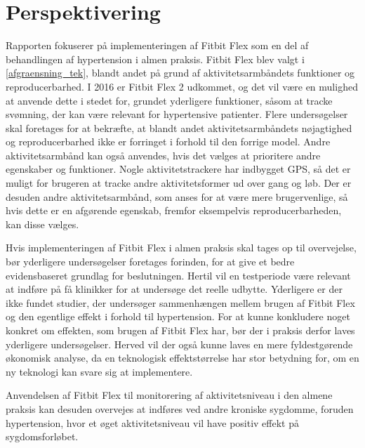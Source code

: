\chapter{Perspektivering}
Rapporten fokuserer på implementeringen af Fitbit Flex som en del af behandlingen af hypertension i almen praksis. Fitbit Flex blev valgt i \autoref{afgraensning_tek}, blandt andet på grund af aktivitetsarmbåndets funktioner og reproducerbarhed. I 2016 er Fitbit Flex 2 udkommet, og det vil være en mulighed at anvende dette i stedet for, grundet yderligere funktioner, såsom at tracke svømning, der kan være relevant for hypertensive patienter. Flere undersøgelser skal foretages for at bekræfte, at blandt andet aktivitetsarmbåndets nøjagtighed og reproducerbarhed ikke er forringet i forhold til den forrige model. Andre aktivitetsarmbånd kan også anvendes, hvis det vælges at prioritere andre egenskaber og funktioner. Nogle aktivitetstrackere har indbygget GPS, så det er muligt for brugeren at tracke andre aktivitetsformer ud over gang og løb. Der er desuden andre aktivitetsarmbånd,  som anses for at være mere brugervenlige, så hvis dette er en afgørende egenskab, fremfor eksempelvis reproducerbarheden, kan disse vælges.

Hvis implementeringen af Fitbit Flex i almen praksis skal tages op til overvejelse, bør yderligere undersøgelser foretages forinden, for at give et bedre evidensbaseret grundlag for beslutningen. Hertil vil en testperiode være relevant at indføre på få klinikker for at undersøge det reelle udbytte.
Yderligere er der ikke fundet studier, der undersøger sammenhængen mellem brugen af Fitbit Flex og den egentlige effekt i forhold til hypertension. For at kunne konkludere noget konkret om effekten, som brugen af Fitbit Flex har, bør der i praksis derfor laves yderligere undersøgelser. Herved vil der også kunne laves en mere fyldestgørende økonomisk analyse, da en teknologisk effektstørrelse har stor betydning for, om en ny teknologi kan svare sig at implementere.

Anvendelsen af Fitbit Flex til monitorering af aktivitetsniveau i den almene praksis kan desuden overvejes at indføres ved andre kroniske sygdomme, foruden hypertension, hvor et øget aktivitetsniveau vil have positiv effekt på sygdomsforløbet.
